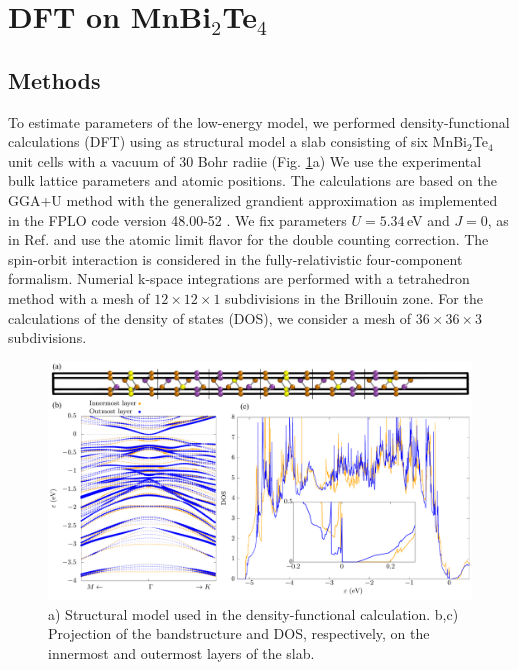 \documentclass[showpacs, preprintnumbers, pra, superscriptaddress, floatfix, onecolumn, longbibliography]{revtex4-1}
\begin{document}
\title{}


\maketitle

\section{DFT on MnBi$_2$Te$_4$}

\subsection{Methods}

To estimate parameters of the low-energy model, we performed  density-functional calculations (DFT) using as structural model a slab consisting of six MnBi$_2$Te$_4$ unit cells with a vacuum of 30 Bohr radiie (Fig. \ref{dft_structure}a)
We use the experimental bulk lattice parameters and atomic positions.
The calculations are based on the GGA+U method with the generalized grandient approximation \cite{perdew1996generalized} as implemented in the FPLO code version 48.00-52 \cite{PhysRevB.59.1743}. We fix parameters $U=5.34\,$eV and $J=0$, as in Ref. \cite{otrokov2019prediction} and use the atomic limit flavor for the double counting correction. The spin-orbit interaction is considered in the fully-relativistic four-component formalism. Numerial k-space integrations are performed with a tetrahedron method with a mesh of $12\times12\times1$ subdivisions in the Brillouin zone. For the calculations of the density of states (DOS), we consider a mesh of $36\times36\times3$ subdivisions.

\begin{figure}[h!]
 \centering
 \includegraphics[width=18 cm]{plot.pdf}
	\caption{a) Structural model used in the density-functional calculation. b,c) Projection of the bandstructure and DOS, respectively, on the innermost and outermost layers of the slab.}
	\label{dft_structure}
\end{figure}
\end{document}
